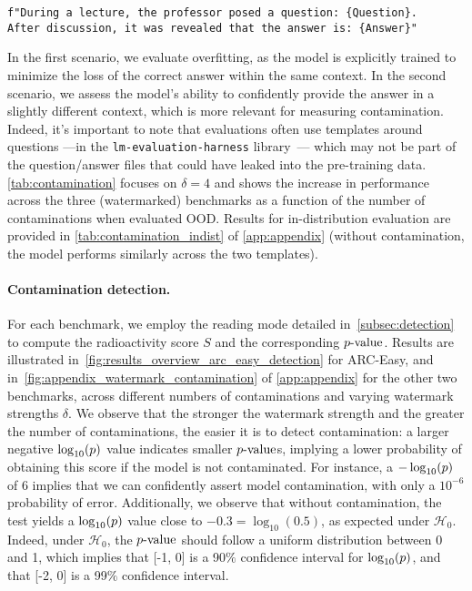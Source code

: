 \begin{center}
    \texttt{f"During a lecture, the professor posed a question: \{Question\}. \\ After discussion, it was revealed that the answer is: \{Answer\}"}
\end{center}

In the first scenario, we evaluate overfitting, as the model is explicitly trained to minimize the loss of the correct answer within the same context. 
In the second scenario, we assess the model's ability to confidently provide the answer in a slightly different context, which is more relevant for measuring contamination.
Indeed, it's important to note that evaluations often use templates around questions ---\eg in the \texttt{lm-evaluation-harness} library~\citep{eval-harness}--- which may not be part of the question/answer files that could have leaked into the pre-training data.
\autoref{tab:contamination} focuses on $\delta=4$ and shows the increase in performance across the three (watermarked) benchmarks as a function of the number of contaminations when evaluated OOD. 
Results for in-distribution evaluation are provided in \autoref{tab:contamination_indist} of \autoref{app:appendix} (without contamination, the model performs similarly across the two templates).


\paragraph{\textbf{Contamination detection.}}
For each benchmark, we employ the reading mode detailed in~\autoref{subsec:detection} to compute the radioactivity score $S$ and the corresponding $p\textrm{-value}$.
Results are illustrated in~\autoref{fig:results_overview_arc_easy_detection} for ARC-Easy, and in~\autoref{fig:appendix_watermark_contamination} of \autoref{app:appendix} for the other two benchmarks, across different numbers of contaminations and varying watermark strengths $\delta$.
We observe that the stronger the watermark strength and the greater the number of contaminations, the easier it is to detect contamination: a larger negative $\log_{10}(p)$ value indicates smaller $p\textrm{-value}$s, implying a lower probability of obtaining this score if the model is not contaminated.
For instance, a $-\log_{10}(p)$ of $6$ implies that we can confidently assert model contamination, with only a $10^{-6}$ probability of error.
Additionally, we observe that without contamination, the test yields a $\log_{10}(p)$ value close to $-0.3 = \log_{10}(0.5) $, as expected under $\mathcal{H}_0$.
Indeed, under $\mathcal{H}_0$, the $p\textrm{-value}$ should follow a uniform distribution between 0 and 1, which implies that [-1, 0] is a 90$\%$ confidence interval for $\log_{10}(p)$, and that [-2, 0] is a 99$\%$ confidence interval.

